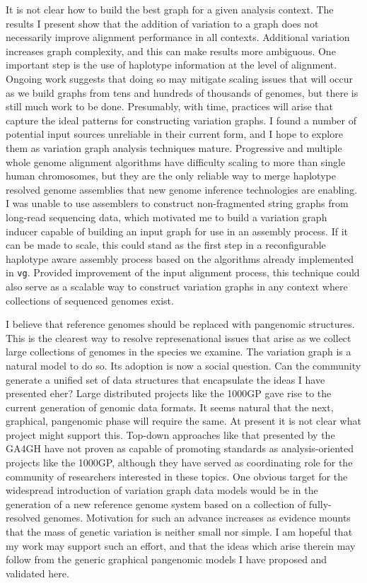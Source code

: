 It is not clear how to build the best graph for a given analysis context.
The results I present show that the addition of variation to a graph does not necessarily improve alignment performance in all contexts.
Additional variation increases graph complexity, and this can make results more ambiguous.
One important step is the use of haplotype information at the level of alignment.
Ongoing work suggests that doing so may mitigate scaling issues that will occur as we build graphs from tens and hundreds of thousands of genomes, but there is still much work to be done.
Presumably, with time, practices will arise that capture the ideal patterns for constructing variation graphs.
I found a number of potential input sources unreliable in their current form, and I hope to explore them as variation graph analysis techniques mature.
Progressive and multiple whole genome alignment algorithms have difficulty scaling to more than single human chromosomes, but they are the only reliable way to merge haplotype resolved genome assemblies that new genome inference technologies are enabling.
I was unable to use assemblers to construct non-fragmented string graphs from long-read sequencing data, which motivated me to build a variation graph inducer capable of building an input graph for use in an assembly process.
If it can be made to scale, this could stand as the first step in a reconfigurable haplotype aware assembly process based on the algorithms already implemented in {\tt vg}.
Provided improvement of the input alignment process, this technique could also serve as a scalable way to construct variation graphs in any context where collections of sequenced genomes exist.

I believe that reference genomes should be replaced with pangenomic structures.
This is the clearest way to resolve represenational issues that arise as we collect large collections of genomes in the species we examine.
The variation graph is a natural model to do so.
Its adoption is now a social question.
Can the community generate a unified set of data structures that encapsulate the ideas I have presented eher?
Large distributed projects like the 1000GP gave rise to the current generation of genomic data formats.
It seems natural that the next, graphical, pangenomic phase will require the same.
At present it is not clear what project might support this.
Top-down approaches like that presented by the GA4GH have not proven as capable of promoting standards as analysis-oriented projects like the 1000GP, although they have served as coordinating role for the community of researchers interested in these topics.
One obvious target for the widespread introduction of variation graph data models would be in the generation of a new reference genome system based on a collection of fully-resolved genomes.
Motivation for such an advance increases as evidence mounts that the mass of genetic variation is neither small nor simple.
I am hopeful that my work may support such an effort, and that the ideas which arise therein may follow from the generic graphical pangenomic models I have proposed and validated here.
